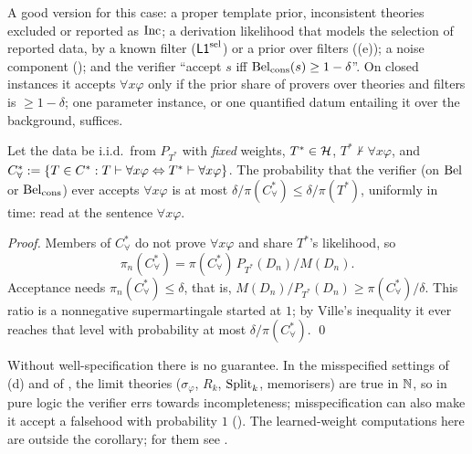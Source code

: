 A good version for this case: a proper template prior, inconsistent theories excluded or reported as $\mathrm{Inc}$; a derivation likelihood that models the selection of reported data, by a known filter ($\mathord{\mathsf{L1}}^{\mathrm{sel}}$) or a prior over filters ((e)); a noise component (); and the verifier ``accept $s$ iff $\mathrm{Bel}_{\mathrm{cons}}(s)\ge1-\delta$''. On closed instances it accepts $\forall x\varphi$ only if the prior share of provers over theories and filters is $\ge1-\delta$; one parameter instance, or one quantified datum entailing it over the background, suffices.

\begin{corollary}\label{cor:univ:sound}
Let the data be i.i.d.\ from $P_{T^*}$ with \emph{fixed} weights, $T^*\in\mathcal{H}$, $T^*\nvdash\forall x\varphi$, and $C^*_\forall:=\{T\in C^{*}:T\vdash\forall x\varphi\Leftrightarrow T^*\vdash\forall x\varphi\}$. The probability that the verifier (on $\mathrm{Bel}$ or $\mathrm{Bel}_{\mathrm{cons}}$) ever accepts $\forall x\varphi$ is at most $\delta/\pi(C^*_\forall)\le\delta/\pi(T^*)$, uniformly in time:  read at the sentence $\forall x\varphi$.
\end{corollary}

\noindent\emph{Proof.} Members of $C^*_\forall$ do not prove $\forall x\varphi$ and share $T^*$'s likelihood, so
\[\pi_n(C^*_\forall)=\pi(C^*_\forall)\,P_{T^*}(D_n)/M(D_n).\]
Acceptance needs $\pi_n(C^*_\forall)\le\delta$, that is, $M(D_n)/P_{T^*}(D_n)\ge\pi(C^*_\forall)/\delta$. This ratio is a nonnegative supermartingale started at $1$; by Ville's inequality it ever reaches that level with probability at most $\delta/\pi(C^*_\forall)$. \qed

Without well-specification there is no guarantee. In the misspecified settings of (d) and of , the limit theories ($\sigma_\varphi$, $R_k$, $\mathrm{Split}_k$, memorisers) are true in $\mathbb{N}$, so in pure logic the verifier errs towards incompleteness; misspecification can also make it accept a falsehood with probability $1$ (). The learned-weight computations here are outside the corollary; for them see .

